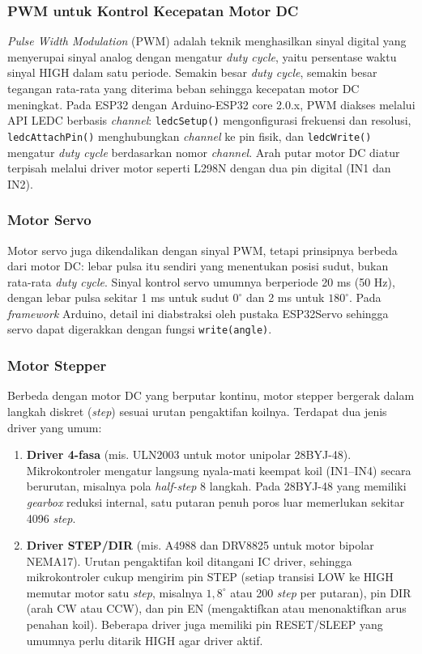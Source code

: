 \subsubsection{PWM untuk Kontrol Kecepatan Motor DC}
\textit{Pulse Width Modulation} (PWM) adalah teknik menghasilkan sinyal digital
yang menyerupai sinyal analog dengan mengatur \textit{duty cycle}, yaitu
persentase waktu sinyal HIGH dalam satu periode. Semakin besar \textit{duty
cycle}, semakin besar tegangan rata-rata yang diterima beban sehingga kecepatan
motor DC meningkat. Pada ESP32 dengan Arduino-ESP32 core 2.0.x,
PWM diakses melalui API LEDC berbasis \textit{channel}: \texttt{ledcSetup()}
mengonfigurasi frekuensi dan resolusi, \texttt{ledcAttachPin()} menghubungkan
\textit{channel} ke pin fisik, dan \texttt{ledcWrite()} mengatur \textit{duty
cycle} berdasarkan nomor \textit{channel}. Arah
putar motor DC diatur terpisah melalui driver motor seperti L298N dengan dua
pin digital (IN1 dan IN2).

\subsubsection{Motor Servo}
Motor servo juga dikendalikan dengan sinyal PWM, tetapi prinsipnya berbeda dari
motor DC: lebar pulsa itu sendiri yang menentukan posisi sudut, bukan rata-rata
\textit{duty cycle}. Sinyal kontrol servo umumnya berperiode 20 ms (50 Hz),
dengan lebar pulsa sekitar 1 ms untuk sudut $0^\circ$ dan 2 ms untuk
$180^\circ$. Pada \textit{framework} Arduino, detail ini
diabstraksi oleh pustaka ESP32Servo sehingga servo dapat digerakkan dengan
fungsi \texttt{write(angle)}.

\subsubsection{Motor Stepper}
Berbeda dengan motor DC yang berputar kontinu, motor stepper bergerak dalam
langkah diskret (\textit{step}) sesuai urutan pengaktifan koilnya. Terdapat dua jenis driver yang umum:
\begin{enumerate}
  \item \textbf{Driver 4-fasa} (mis. ULN2003 untuk motor unipolar 28BYJ-48).
        Mikrokontroler mengatur langsung nyala-mati keempat koil
        (IN1--IN4) secara berurutan, misalnya pola \textit{half-step} 8
        langkah. Pada 28BYJ-48 yang memiliki \textit{gearbox} reduksi
        internal, satu putaran penuh poros luar memerlukan sekitar 4096
        \textit{step}.
  \item \textbf{Driver STEP/DIR} (mis. A4988 dan DRV8825 untuk motor bipolar
        NEMA17). Urutan pengaktifan koil ditangani IC driver, sehingga
        mikrokontroler cukup mengirim pin STEP (setiap transisi LOW ke HIGH
        memutar motor satu \textit{step}, misalnya $1{,}8^\circ$ atau 200
        \textit{step} per putaran), pin DIR (arah CW atau CCW), dan pin EN
        (mengaktifkan atau menonaktifkan arus penahan koil). Beberapa driver
        juga memiliki pin RESET/SLEEP yang umumnya perlu ditarik HIGH agar
        driver aktif.
\end{enumerate}

